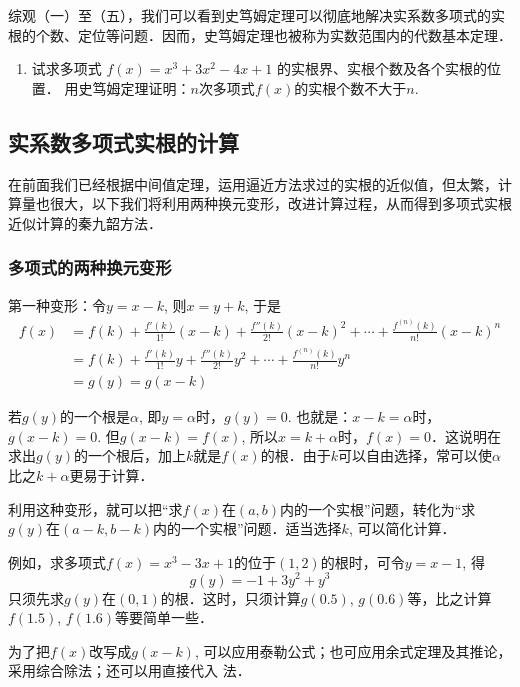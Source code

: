 综观（一）至（五），我们可以看到史笃姆定理可以彻底地解决实系数多项式的实根的个数、定位等问题．因而，史笃姆定理也被称为实数范围内的代数基本定理．

\begin{ex}
\begin{enumerate}
    \item 试求多项式 $f(x)=x^3+3x^2-4x+1$ 的实根界、实根个数及各个实根的位置．
    \staritem 用史笃姆定理证明：$n$次多项式$f(x)$的实根个数不大于$n$.
\end{enumerate}
\end{ex}

\subsection{实系数多项式实根的计算}

在前面我们已经根据中间值定理，运用逼近方法求过的实根的近似值，但太繁，计算量也很大，以下我们将利用两种换元变形，改进计算过程，从而得到多项式实根近似计算的秦九韶方法．

\subsubsection{多项式的两种换元变形}

第一种变形：令$y=x-k$, 则$x=y+k$, 于是
\[\begin{split}
    f(x)&=f(k)+\frac{f'(k)}{1!}(x-k)+\frac{f''(k)}{2!}(x-k)^2+\cdots +\frac{f^{(n)}(k)}{n!}(x-k)^n\\
    &=f(k)+\frac{f'(k)}{1!}y+\frac{f''(k)}{2!}y^2+\cdots +\frac{f^{(n)}(k)}{n!}y^n\\
    &=g(y)=g(x-k)
\end{split}\]

若$g(y)$的一个根是$\alpha$, 即$y=\alpha$时，$g(y)=0$. 也就是：$x-k=\alpha$时，$g(x-k)=0$. 但$g(x-k)=f(x)$, 所以$x=k+\alpha$时，$f(x)=0$．这说明在求出$g(y)$的一个根后，加上$k$就是$f(x)$的根．由于$k$可以自由选择，常可以使$\alpha$比之$k+\alpha$更易于计算．

利用这种变形，就可以把“求$f(x)$在$(a,b)$内的一个实根”问题，转化为“求$g(y)$在$(a-k,b-k)$内的一个实根”问题．适当选择$k$, 可以简化计算．

例如，求多项式$f (x) =x^3-3x+1$的位于$(1, 2)$的根时，可令$y=x-1$, 得
\[g (y) =-1+3y^2+y^3\]
只须先求$g(y)$在$(0, 1)$的根．这时，只须计算$g(0.5)$, $g(0.6)$等，比之计算$f(1. 5)$, $f(1. 6)$等要简单一些．

为了把$f(x)$改写成$g(x-k)$, 可以应用泰勒公式；也可应用余式定理及其推论，采用综合除法；还可以用直接代入
法．

